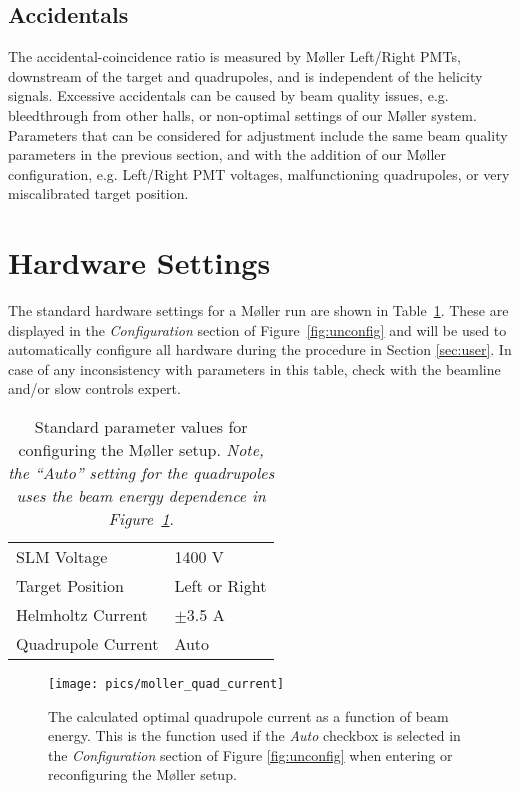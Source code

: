 \documentclass[amsmath,amssymb,notitlepage,12pt]{revtex4}
\begin{document}
\subsection{Accidentals}
The accidental-coincidence ratio is measured by M{\o}ller Left/Right PMTs, downstream of the target and quadrupoles, and is independent of the helicity signals.  Excessive accidentals can be caused by beam quality issues, e.g. bleedthrough from other halls, or non-optimal settings of our M{\o}ller system.  Parameters that can be considered for adjustment include the same beam quality parameters in the previous section, and with the addition of our M{\o}ller configuration, e.g. Left/Right PMT voltages, malfunctioning quadrupoles, or very miscalibrated target position.

\section{Hardware Settings}
The standard hardware settings for a M{\o}ller run are shown in Table~\ref{tab:pars}.  These are displayed in the {\em Configuration} section of Figure~\ref{fig:unconfig} and will be used to automatically configure all hardware during the procedure in Section \ref{sec:user}.  In case of any inconsistency with parameters in this table, check with the beamline and/or slow controls expert.

\begin{table}[htbp]\centering
    \begin{tabular}{ll}\toprule[1.5pt]
        SLM Voltage & 1400 V \\
        Target Position & Left or Right \\
        Helmholtz Current & $\pm$3.5 A \\
        Quadrupole Current & Auto \\
        \bottomrule[1.5pt]
    \end{tabular}
    \caption{Standard parameter values for configuring the M{\o}ller setup. {\em  Note, the ``Auto'' setting for the quadrupoles uses the beam energy dependence in Figure~\ref{fig:quadenergy}}.\label{tab:pars}}
\end{table}

\begin{figure}[htbp]\centering
    \texttt{[image: pics/moller\_quad\_current]}
    \caption{The calculated optimal quadrupole current as a function of beam energy.  This is the function used if the {\em Auto} checkbox is selected in the {\em Configuration} section of Figure \ref{fig:unconfig} when entering or reconfiguring the M{\o}ller setup.\label{fig:quadenergy}}
\end{figure}
\end{document}
